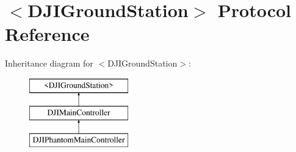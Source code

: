 \hypertarget{protocol_d_j_i_ground_station-p}{\section{$<$D\+J\+I\+Ground\+Station$>$ Protocol Reference}
\label{protocol_d_j_i_ground_station-p}
}
Inheritance diagram for $<$D\+J\+I\+Ground\+Station$>$\+:\begin{figure}[H]
\begin{center}
\leavevmode
\includegraphics[height=3.000000cm]{protocol_d_j_i_ground_station-p}
\end{center}
\end{figure}
